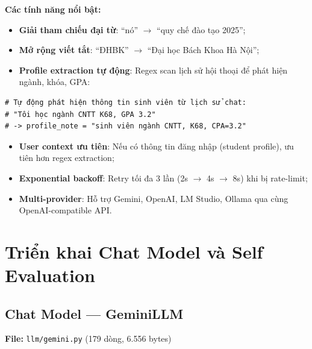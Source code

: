 \documentclass[../DoAn.tex]{subfiles}
\begin{document}
\textbf{Các tính năng nổi bật:}
\begin{itemize}
    \item \textbf{Giải tham chiếu đại từ}: ``nó'' $\rightarrow$ ``quy chế đào tạo 2025'';
    \item \textbf{Mở rộng viết tắt}: ``ĐHBK'' $\rightarrow$ ``Đại học Bách Khoa Hà Nội'';
    \item \textbf{Profile extraction tự động}: Regex scan lịch sử hội thoại để phát hiện ngành, khóa, GPA:
\end{itemize}
\begin{verbatim}
# Tự động phát hiện thông tin sinh viên từ lịch sử chat:
# "Tôi học ngành CNTT K68, GPA 3.2"
# -> profile_note = "sinh viên ngành CNTT, K68, CPA=3.2"
\end{verbatim}
\begin{itemize}
    \item \textbf{User context ưu tiên}: Nếu có thông tin đăng nhập (student profile), ưu tiên hơn regex extraction;
    \item \textbf{Exponential backoff}: Retry tối đa 3 lần (2s $\rightarrow$ 4s $\rightarrow$ 8s) khi bị rate-limit;
    \item \textbf{Multi-provider}: Hỗ trợ Gemini, OpenAI, LM Studio, Ollama qua cùng OpenAI-compatible API.
\end{itemize}


\section{Triển khai Chat Model và Self Evaluation}

\subsection{Chat Model --- GeminiLLM}
\textbf{File:} \texttt{llm/gemini.py} (179 dòng, 6.556 bytes)
\end{document}

